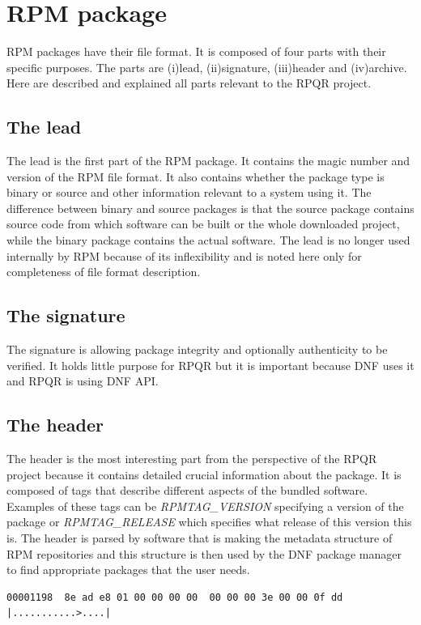 \section{RPM package}
RPM packages have their file format\cite{RPMFileFormat}. It is composed of four parts with their specific purposes.
The parts are (i)lead, (ii)signature, (iii)header and (iv)archive. Here are described and explained all parts
relevant to the RPQR project.

\subsection*{The lead}
The lead is the first part of the RPM package. It contains the magic number and version of the RPM file format.
It also contains whether the package type is binary or source and other information relevant
to a system using it. The difference between binary and source packages is that the source package contains
source code from which software can be built or the whole downloaded project, while the binary package
contains the actual software. The lead is no longer used internally by RPM because of its
inflexibility and is noted here only for completeness of file format description.

\subsection*{The signature}
The signature is allowing package integrity and optionally authenticity to be verified. It holds
little purpose for RPQR but it is important because DNF uses it and RPQR is using DNF API.

\subsection*{The header}
The header is the most interesting part from the perspective of the RPQR project because it contains
detailed crucial information about the package. It is composed of tags that describe different
aspects of the bundled software. Examples of these tags can be \mbox{\textit{RPMTAG\_VERSION}}
specifying a version of the package or \textit{RPMTAG\_RELEASE} which specifies what release of
this version this is. The header is parsed by software that is making the metadata structure of RPM
repositories and this structure is then used by the DNF package manager to find appropriate
packages that the user needs.

\begin{lstlisting}
00001198  8e ad e8 01 00 00 00 00  00 00 00 3e 00 00 0f dd  |...........>....|
\end{lstlisting}


